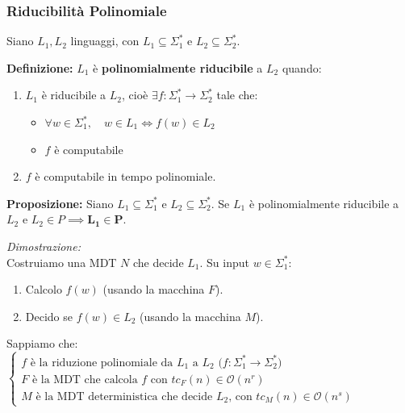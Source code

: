 \vspace{0.8cm}

\subsubsection{Riducibilità Polinomiale}

Siano $L_1, L_2$ linguaggi, con $L_1 \subseteq \Sigma_1^*$ e $L_2 \subseteq \Sigma_2^*$.

\vspace{0.2cm}
\textbf{Definizione:} $L_1$ è \textbf{polinomialmente riducibile} a $L_2$ quando:
\begin{enumerate}
    \item $L_1$ è riducibile a $L_2$, cioè $\exists f: \Sigma_1^* \to \Sigma_2^*$ tale che:
    \begin{itemize}
        \item $\forall w \in \Sigma_1^*, \quad w \in L_1 \iff f(w) \in L_2$
        \item $f$ è computabile
    \end{itemize}
    \item $f$ è computabile in tempo polinomiale.
\end{enumerate}

\vspace{0.6cm}
\textbf{Proposizione:} Siano $L_1 \subseteq \Sigma_1^*$ e $L_2 \subseteq \Sigma_2^*$. 
Se $L_1$ è polinomialmente riducibile a $L_2$ e $L_2 \in P \implies \mathbf{L_1 \in P}$.

\vspace{0.2cm}
\textit{Dimostrazione:} \\
Costruiamo una MDT $N$ che decide $L_1$. Su input $w \in \Sigma_1^*$:
\begin{enumerate}
    \item Calcolo $f(w)$ (usando la macchina $F$).
    \item Decido se $f(w) \in L_2$ (usando la macchina $M$).
\end{enumerate}

Sappiamo che:
$
\begin{cases}
    \text{$f$ è la riduzione polinomiale da $L_1$ a $L_2$ ($f: \Sigma_1^* \to \Sigma_2^*$)} \\
    \text{$F$ è la MDT che calcola $f$ con } tc_F(n) \in \mathcal{O}(n^r) \\
    \text{$M$ è la MDT deterministica che decide $L_2$, con } tc_M(n) \in \mathcal{O}(n^s)
\end{cases}
$

